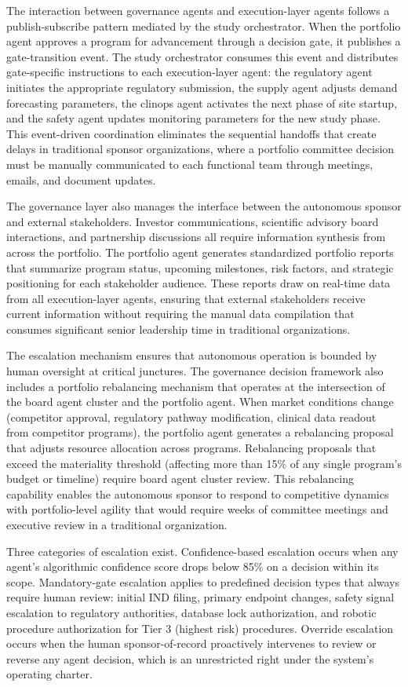 The interaction between governance agents and execution-layer agents follows a publish-subscribe
pattern mediated by the study orchestrator. When the portfolio agent approves a program for
advancement through a decision gate, it publishes a gate-transition event. The study
orchestrator consumes this event and distributes gate-specific instructions to each
execution-layer agent: the regulatory agent initiates the appropriate regulatory submission,
the supply agent adjusts demand forecasting parameters, the clinops agent activates the next
phase of site startup, and the safety agent updates monitoring parameters for the new study
phase. This event-driven coordination eliminates the sequential handoffs that create delays in
traditional sponsor organizations, where a portfolio committee decision must be manually
communicated to each functional team through meetings, emails, and document updates.

The governance layer also manages the interface between the autonomous sponsor and external
stakeholders. Investor communications, scientific advisory board interactions, and partnership
discussions all require information synthesis from across the portfolio. The portfolio agent
generates standardized portfolio reports that summarize program status, upcoming milestones,
risk factors, and strategic positioning for each stakeholder audience. These reports draw on
real-time data from all execution-layer agents, ensuring that external stakeholders receive
current information without requiring the manual data compilation that consumes significant
senior leadership time in traditional organizations.

The escalation mechanism ensures that autonomous operation is bounded by human oversight at
critical junctures. The governance decision framework also includes a portfolio rebalancing mechanism that
operates at the intersection of the board agent cluster and the portfolio agent. When
market conditions change (competitor approval, regulatory pathway modification, clinical
data readout from competitor programs), the portfolio agent generates a rebalancing
proposal that adjusts resource allocation across programs. Rebalancing proposals that
exceed the materiality threshold (affecting more than 15\% of any single program's
budget or timeline) require board agent cluster review. This rebalancing capability enables
the autonomous sponsor to respond to competitive dynamics with portfolio-level agility
that would require weeks of committee meetings and executive review in a traditional
organization.

Three categories of escalation exist. Confidence-based escalation occurs
when any agent's algorithmic confidence score drops below 85\% on a decision within its
scope. Mandatory-gate escalation applies to predefined decision types that always require
human review: initial IND filing, primary endpoint changes, safety signal escalation to
regulatory authorities, database lock authorization, and robotic procedure authorization for
Tier 3 (highest risk) procedures. Override escalation occurs when the human sponsor-of-record
proactively intervenes to review or reverse any agent decision, which is an unrestricted right
under the system's operating charter.

